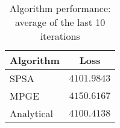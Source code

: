 \begin{table}[H]
    \centering
    \begin{tabular}{lc}
    \toprule
    \textbf{Algorithm} & \textbf{Loss} \\
    \midrule
    SPSA & $4101.9843$ \\
MPGE & $4150.6167$ \\
Analytical & $4100.4138$ \\
\bottomrule
    \end{tabular}
    \caption{Algorithm performance: average of the last 10 iterations}
    \end{table}